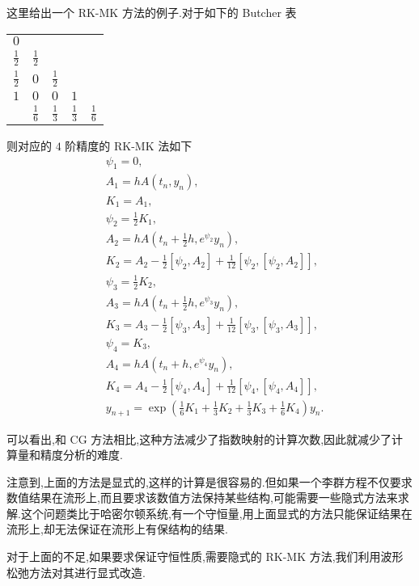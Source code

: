 这里给出一个 RK-MK 方法的例子.对于如下的 Butcher 表
\begin{center}
  \begin{tabular}{c|cccc}
    $0$&&&&\\
    $\frac{1}{2}$&$\frac{1}{2}$&&&\\
    $\frac{1}{2}$&$0$&$\frac{1}{2}$&&\\
    $1$&$0$&$0$&$1$&\\
    \hline
         &$\frac{1}{6}$&$\frac{1}{3}$&$\frac{1}{3}$&$\frac{1}{6}$
  \end{tabular}
\end{center}

则对应的 $4$ 阶精度的 RK-MK 法如下
\begin{equation*}
	\begin{aligned}
		&\psi_1=0,\\
		&A_1=hA(t_n,y_n),\\
		&K_1=A_1,\\
		&\psi_2=\frac{1}{2}K_1,\\
		&A_2=hA(t_n+\frac{1}{2}h,e^{\psi_2}y_n),\\
		&K_2=A_2-\frac{1}{2}[\psi_2,A_2]+\frac{1}{12}[\psi_2,[\psi_2,A_2]],\\
		&\psi_3=\frac{1}{2}K_2,\\
		&A_3=hA(t_n+\frac{1}{2}h,e^{\psi_3}y_n),\\
		&K_3=A_3-\frac{1}{2}[\psi_3,A_3]+\frac{1}{12}[\psi_3,[\psi_3,A_3]],\\
		&\psi_4=K_3,\\
		&A_4=hA(t_n+h,e^{\psi_4}y_n),\\
		&K_4=A_4-\frac{1}{2}[\psi_4,A_4]+\frac{1}{12}[\psi_4,[\psi_4,A_4]],\\
		&y_{n+1}=\exp(\frac{1}{6}K_1+\frac{1}{3}K_2+\frac{1}{3}K_3+\frac{1}{6}K_4)y_n.
	\end{aligned}
\end{equation*}

可以看出,和 CG 方法相比,这种方法减少了指数映射的计算次数,因此就减少了计算量和精度分析的难度.

注意到,上面的方法是显式的,这样的计算是很容易的.但如果一个李群方程不仅要求数值结果在流形上,而且要求该数值方法保持某些结构,可能需要一些隐式方法来求解.这个问题类比于哈密尔顿系统,有一个守恒量,用上面显式的方法只能保证结果在流形上,却无法保证在流形上有保结构的结果.

对于上面的不足,如果要求保证守恒性质,需要隐式的 RK-MK 方法,我们利用波形松弛方法对其进行显式改造.


